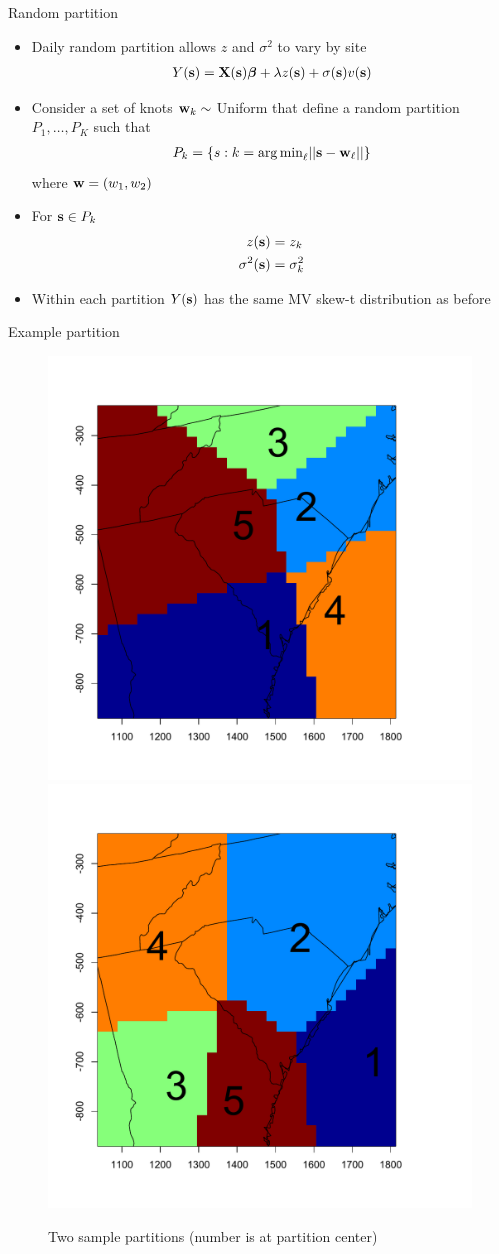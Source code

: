 \documentclass{beamer}
\begin{document}
\begin{frame}{Random partition}
  \begin{itemize} \setlength{\itemsep}{0.5em}
    \item Daily random partition allows $z$ and $\sigma^2$ to vary by site
    \begin{align*}
      Y(\mbox{\bf s}) = \mbox{\bf X}(\mbox{\bf s}) \mbox{\boldmath $\beta$} + \lambda z(\mbox{\bf s}) + \sigma(\mbox{\bf s}) v(\mbox{\bf s})
    \end{align*}
    \item Consider a set of knots $\mbox{\bf w}_{k} \sim$ Uniform that define a random partition
    $P_{1}, \ldots, P_{K}$ such that
    \begin{align*}
      P_{k} = \{s : k = {\mathop{\rm arg\, min}}_\ell|| \mbox{\bf s} - \mbox{\bf w}_{\ell}|| \}
    \end{align*}
    where $\mbox{\bf w} = (w_1, w_2)$
    \item For $\mbox{\bf s} \in P_{k}$
    \begin{align*}
      z(\mbox{\bf s}) &= z_{k}\\
      \sigma^2(\mbox{\bf s}) &= \sigma^2_{k}
    \end{align*}
    \item Within each partition $Y(\mbox{\bf s})$ has the same MV skew-t distribution as before
  \end{itemize}
\end{frame}

\begin{frame}{Example partition}
    \centering
    \begin{figure}
    \includegraphics[width=0.54\linewidth]{./plots/pot/example-partition-1.pdf}
    \includegraphics[width=0.54\linewidth]{./plots/pot/example-partition-2.pdf}
    \caption{Two sample partitions (number is at partition center)}
    \end{figure}
\end{frame}
\end{document}

